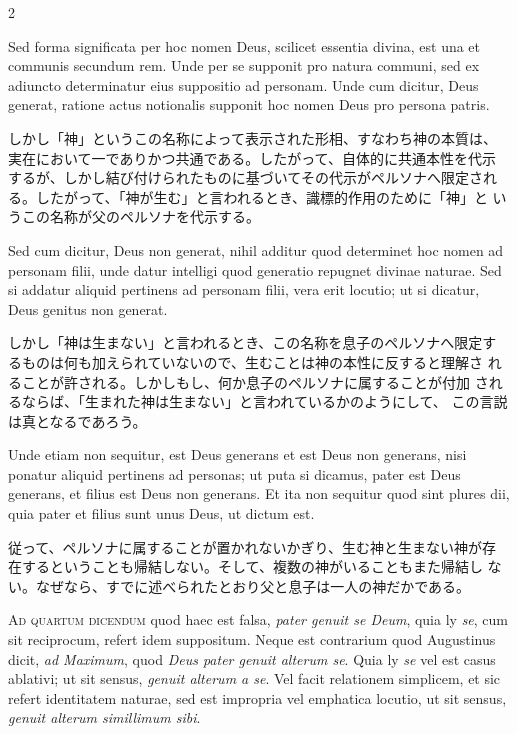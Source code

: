 \documentclass[paper=a4paper,fontsize=10pt,jafontsize=9pt,titlepage]{jlreq}
\begin{document}
\begin{paracol}{2}
\switchcolumn*

Sed forma significata per hoc nomen Deus, scilicet essentia
divina, est una et communis secundum rem. Unde per se supponit pro
natura communi, sed ex adiuncto determinatur eius suppositio ad
personam. Unde cum dicitur, Deus generat, ratione actus notionalis
supponit hoc nomen Deus pro persona patris.

\switchcolumn

しかし「神」というこの名称によって表示された形相、すなわち神の本質は、
実在において一でありかつ共通である。したがって、自体的に共通本性を代示
するが、しかし結び付けられたものに基づいてその代示がペルソナへ限定され
る。したがって、「神が生む」と言われるとき、識標的作用のために「神」と
いうこの名称が父のペルソナを代示する。

\switchcolumn*

Sed cum dicitur, Deus non
generat, nihil additur quod determinet hoc nomen ad personam filii, unde
datur intelligi quod generatio repugnet divinae naturae. Sed si addatur
aliquid pertinens ad personam filii, vera erit locutio; ut si dicatur,
Deus genitus non generat.

\switchcolumn

しかし「神は生まない」と言われるとき、この名称を息子のペルソナへ限定す
 るものは何も加えられていないので、生むことは神の本性に反すると理解さ
 れることが許される。しかしもし、何か息子のペルソナに属することが付加
 されるならば、「生まれた神は生まない」と言われているかのようにして、
 この言説は真となるであろう。

\switchcolumn*

Unde etiam non sequitur, est Deus generans et
est Deus non generans, nisi ponatur aliquid pertinens ad personas; ut
puta si dicamus, pater est Deus generans, et filius est Deus non
generans. Et ita non sequitur quod sint plures dii, quia pater et filius
sunt unus Deus, ut dictum est.

\switchcolumn

従って、ペルソナに属することが置かれないかぎり、生む神と生まない神が存
 在するということも帰結しない。そして、複数の神がいることもまた帰結し
 ない。なぜなら、すでに述べられたとおり父と息子は一人の神だかである。

\switchcolumn*

{\scshape Ad quartum dicendum} quod haec est falsa, \textit{pater genuit se Deum}, quia ly
\textit{se}, cum sit reciprocum, refert idem suppositum. Neque est contrarium
quod Augustinus dicit, \textit{ad Maximum}, quod \textit{Deus pater genuit alterum
se}. Quia ly \textit{se} vel est casus ablativi; ut sit sensus, \textit{genuit alterum a
se}. Vel facit relationem simplicem, et sic refert identitatem naturae,
sed est impropria vel emphatica locutio, ut sit sensus, \textit{genuit alterum
simillimum sibi}.


\end{paracol}
\end{document}
